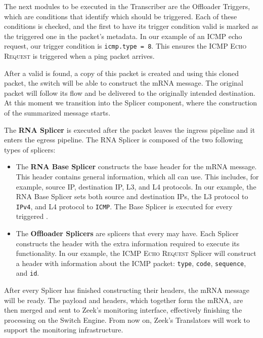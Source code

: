 The next modules to be executed in the Transcriber are the Offloader Triggers, which are conditions that identify which \Offloader{} should be triggered. Each of these conditions is checked, and the first \Offloader{} to have its trigger condition valid is marked as the triggered one in the packet's metadata. In our example of an ICMP echo request, our trigger condition is \texttt{icmp.type = 8}. This ensures the \Offloader{} \textsc{ICMP Echo Request} is triggered when a ping packet arrives.

After a valid \Offloader{} is found, a copy of this packet is created and using this cloned packet, the switch will be able to construct the mRNA message. The original packet will follow its flow and be delivered to the originally intended destination. At this moment we transition into the Splicer component, where the construction of the summarized message starts. 

The \textbf{RNA Splicer} is executed after the packet leaves the ingress pipeline and it enters the egress pipeline\footnotemark{}. The RNA Splicer is composed of the two following types of splicers:

\begin{itemize}
    \item The \textbf{RNA Base Splicer} constructs the base header for the mRNA message. This header contains general information, which all \Offloaders{} can use. This includes, for example, source IP, destination IP, L3, and L4 protocols. In our example, the RNA Base Splicer sets both source and destination IPs, the L3 protocol to \texttt{IPv4}, and L4 protocol to \texttt{ICMP}. The Base Splicer is executed for every triggered \Offloader{}.
    
    \item The \textbf{Offloader Splicers} are splicers that every \Offloader{} may have. Each \Offloader{} Splicer constructs the header with the extra information required to execute its functionality. In our example, the \textsc{ICMP Echo Request} Splicer will construct a header with information about the ICMP packet: \texttt{type}, \texttt{code}, \texttt{sequence}, and \texttt{id}.
\end{itemize}


After every Splicer has finished constructing their headers, the mRNA message will be ready. The payload and headers, which together form the mRNA, are then merged and sent to Zeek's monitoring interface, effectively finishing the processing on the Switch Engine. From now on, Zeek's Translators will work to support the monitoring infrastructure.

